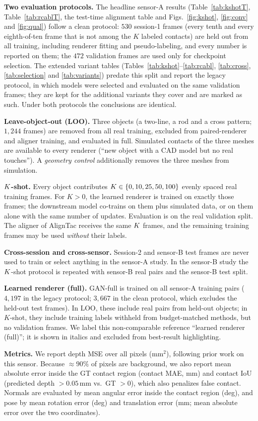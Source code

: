 \noindent\textbf{Two evaluation protocols.} The headline sensor-A results (Table~\ref{tab:kshotT}, Table~\ref{tab:rcablT}, the test-time alignment table and Figs.~\ref{fig:kshot}, \ref{fig:conv} and \ref{fig:qual}) follow a clean protocol: $530$ session-1 frames (every tenth and every eighth-of-ten frame that is not among the $K$ labeled contacts) are held out from all training, including renderer fitting and pseudo-labeling, and every number is reported on them; the $472$ validation frames are used only for checkpoint selection. The extended variant tables (Tables~\ref{tab:kshot}--\ref{tab:rcabl}, \ref{tab:cross}, \ref{tab:selection} and \ref{tab:variants}) predate this split and report the legacy protocol, in which models were selected and evaluated on the same validation frames; they are kept for the additional variants they cover and are marked as such. Under both protocols the conclusions are identical.

\noindent\textbf{Leave-object-out (LOO).} Three objects (a two-line, a rod and a cross pattern; $1{,}244$ frames) are removed from all real training, excluded from paired-renderer and aligner training, and evaluated in full. Simulated contacts of the three meshes are available to every renderer (``new object with a CAD model but no real touches''). A \emph{geometry control} additionally removes the three meshes from simulation.

\noindent\textbf{$K$-shot.} Every object contributes $K\in\{0,10,25,50,100\}$ evenly spaced real training frames. For $K>0$, the learned renderer is trained on exactly those frames; the downstream model co-trains on them plus simulated data, or on them alone with the same number of updates. Evaluation is on the real validation split. The aligner of AlignTac receives the same $K$ frames, and the remaining training frames may be used \emph{without} their labels.

\noindent\textbf{Cross-session and cross-sensor.} Session-2 and sensor-B test frames are never used to train or select anything in the sensor-A study. In the sensor-B study the $K$-shot protocol is repeated with sensor-B real pairs and the sensor-B test split.

\noindent\textbf{Learned renderer (full).} GAN-full is trained on all sensor-A training pairs ($4{,}197$ in the legacy protocol; $3{,}667$ in the clean protocol, which excludes the held-out test frames). In LOO, these include real pairs from held-out objects; in $K$-shot, they include training labels withheld from budget-matched methods, but no validation frames. We label this non-comparable reference ``learned renderer (full)''; it is shown in italics and excluded from best-result highlighting.

\noindent\textbf{Metrics.} We report depth MSE over all pixels ($\mathrm{mm}^2$), following prior work on this sensor. Because $\approx90\%$ of pixels are background, we also report mean absolute error inside the GT contact region (contact MAE, mm) and contact IoU (predicted depth $>0.05\,$mm vs.\ GT $>0$), which also penalizes false contact. Normals are evaluated by mean angular error inside the contact region (deg), and pose by mean rotation error (deg) and translation error (mm; mean absolute error over the two coordinates).
